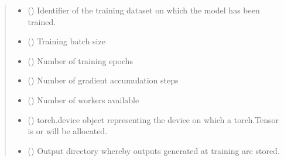 \documentclass[letterpaper,10pt,english]{sphinxmanual}
\begin{document}
\begin{fulllineitems}
\begin{fulllineitems}
\begin{quote}
\begin{description}
\begin{itemize}
\item {} 
\sphinxAtStartPar
{} () \textendash{} Identifier of the training dataset on which the model has been trained.

\item {} 
\sphinxAtStartPar
{} () \textendash{} Training batch size

\item {} 
\sphinxAtStartPar
{} () \textendash{} Number of training epochs

\item {} 
\sphinxAtStartPar
{} () \textendash{} Number of gradient accumulation steps

\item {} 
\sphinxAtStartPar
{} () \textendash{} Number of workers available

\item {} 
\sphinxAtStartPar
{} () \textendash{} torch.device object representing the device on which a torch.Tensor is or
will be allocated.

\item {} 
\sphinxAtStartPar
{} (\sphinxstyleliteralemphasis{\sphinxupquote{{[}}}\sphinxstyleliteralemphasis{\sphinxupquote{, }}\sphinxstyleliteralemphasis{\sphinxupquote{{]}}}) \textendash{} Output directory whereby outputs generated at training are stored.

\end{itemize}

\end{description}\end{quote}

\end{fulllineitems}



\end{fulllineitems}
\end{document}
